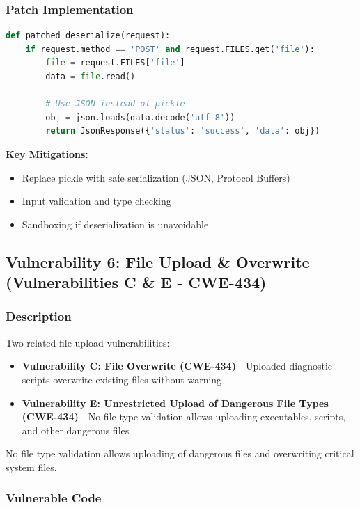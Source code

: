 \documentclass[12pt,a4paper]{article}
\begin{document}
\subsubsection{Patch Implementation}

\begin{lstlisting}[language=Python]
def patched_deserialize(request):
    if request.method == 'POST' and request.FILES.get('file'):
        file = request.FILES['file']
        data = file.read()
        
        # Use JSON instead of pickle
        obj = json.loads(data.decode('utf-8'))
        return JsonResponse({'status': 'success', 'data': obj})
\end{lstlisting}

\textbf{Key Mitigations:}
\begin{itemize}[leftmargin=*]
    \item Replace pickle with safe serialization (JSON, Protocol Buffers)
    \item Input validation and type checking
    \item Sandboxing if deserialization is unavoidable
\end{itemize}

\subsection{Vulnerability 6: File Upload \& Overwrite (Vulnerabilities C \& E - CWE-434)}

\subsubsection{Description}
Two related file upload vulnerabilities:
\begin{itemize}[leftmargin=*]
    \item \textbf{Vulnerability C: File Overwrite (CWE-434)} - Uploaded diagnostic scripts overwrite existing files without warning
    \item \textbf{Vulnerability E: Unrestricted Upload of Dangerous File Types (CWE-434)} - No file type validation allows uploading executables, scripts, and other dangerous files
\end{itemize}
No file type validation allows uploading of dangerous files and overwriting critical system files.

\subsubsection{Vulnerable Code}
\end{document}
